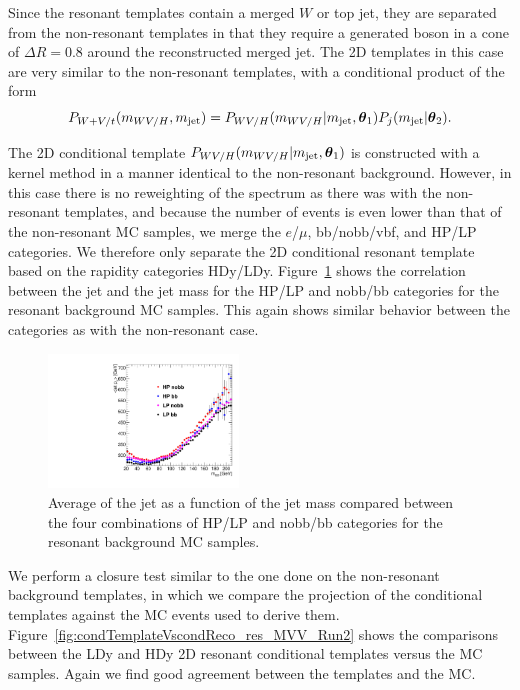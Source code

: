 Since the resonant templates contain a merged $W$ or top jet, they are separated from the non-resonant templates in that they require a generated boson in a cone of $\Delta R=0.8$ around the reconstructed merged jet.
The 2D templates in this case are very similar to the non-resonant templates, with a conditional product of the form
\begin{equation}
  P_{W+V/t}(m_{WV/H},m_\mathrm{jet})=P_{WV/H}(m_{WV/H}|m_\mathrm{jet},\vb*{\theta}_1)P_j(m_\mathrm{jet}|\vb*{\theta}_2).
\end{equation}

The 2D conditional template $P_{WV/H}(m_{WV/H}|m_\mathrm{jet},\vb*{\theta}_1)$ is constructed with a kernel method in a manner identical to the non-resonant background.
However, in this case there is no reweighting of the \MVV spectrum as there was with the non-resonant templates, and because the number of events is even lower than that of the non-resonant MC samples, we merge the $e$/$\mu$, bb/nobb/vbf, and HP/LP categories.
We therefore only separate the 2D conditional resonant template based on the rapidity categories HDy/LDy.
Figure~\ref{fig:res2DCorr} shows the correlation between the jet \pt and the jet mass for the HP/LP and nobb/bb categories for the resonant background MC samples.
This again shows similar behavior between the categories as with the non-resonant case.

\begin{figure}[htbp]
  \centering
  \includegraphics[width=0.45\textwidth]{fig/2Dfit/res_corr.pdf}
  \caption{
    Average \pt of the jet as a function of the jet mass \MJ compared between the four combinations of HP/LP and nobb/bb categories for the resonant background MC samples.
  }
  \label{fig:res2DCorr}
\end{figure}

We perform a closure test similar to the one done on the non-resonant background templates, in which we compare the \MVV projection of the conditional templates against the MC events used to derive them.
Figure~\ref{fig:condTemplateVscondReco_res_MVV_Run2} shows the comparisons between the LDy and HDy 2D resonant conditional templates versus the MC samples.
Again we find good agreement between the templates and the MC.


